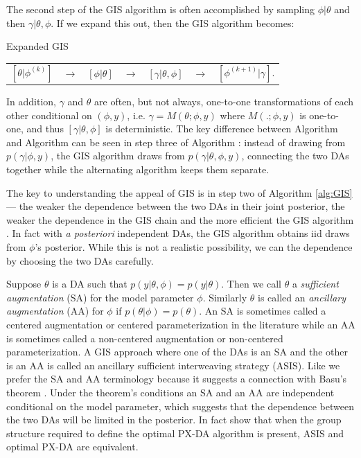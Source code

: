\documentclass[12pt]{article}
\begin{document}
The second step of the GIS algorithm is often accomplished by sampling $\phi|\theta$ and then $\gamma|\theta,\phi$. If we expand this out, then the GIS algorithm becomes:
\begin{alg*}[eGIS]Expanded GIS\label{alg:eGIS}
{\small
  \begin{center}
    \begin{tabular}{lllllll}
      $[\theta|\phi^{(k)}]$& $\to$& $[\phi|\theta]$& $\to $&$[\gamma|\theta,\phi]$& $\to$& $[\phi^{(k+1)}|\gamma]$.
    \end{tabular}
  \end{center}
}
\end{alg*}
\noindent
In addition, $\gamma$ and $\theta$ are often, but not always, one-to-one transformations of each other conditional on $(\phi,y)$, i.e. $\gamma = M(\theta;\phi,y)$ where $M(.;\phi,y)$ is one-to-one, and thus $[\gamma|\theta,\phi]$ is deterministic. The key difference between Algorithm  and Algorithm  can be seen in step three of Algorithm : instead of drawing from $p(\gamma|\phi,y)$, the GIS algorithm draws from $p(\gamma|\theta,\phi,y)$, connecting the two DAs together while the alternating algorithm keeps them separate.

The key to understanding the appeal of GIS is in step two of Algorithm \ref{alg:GIS} --- the weaker the dependence between the two DAs in their joint posterior, the weaker the dependence in the GIS chain and the more efficient the GIS algorithm \citep{yu2011center}. In fact with \emph{a posteriori} independent DAs, the GIS algorithm obtains iid draws from $\phi$'s posterior. While this is not a realistic possibility, we can the dependence by choosing the two DAs carefully. 

Suppose $\theta$ is a DA such that $p(y|\theta,\phi)=p(y|\theta)$. Then we call $\theta$ a {\it sufficient augmentation} (SA) for the model parameter $\phi$. Similarly $\theta$ is called an {\it ancillary augmentation} (AA) for $\phi$ if $p(\theta|\phi)=p(\theta)$. An SA is sometimes called a centered augmentation or centered parameterization in the literature while an AA is sometimes called a non-centered augmentation or non-centered parameterization. A GIS approach where one of the DAs is an SA and the other is an AA is called an ancillary sufficient interweaving strategy (ASIS). Like \citet{yu2011center} we prefer the SA and AA terminology because it suggests a connection with Basu's theorem \citep{basu1955statistics}. Under the theorem's conditions an SA and an AA are independent conditional on the model parameter, which suggests that the dependence between the two DAs will be limited in the posterior. In fact \citet{yu2011center} show that when the group structure required to define the optimal PX-DA algorithm \citep{liu1999parameter} is present, ASIS and optimal PX-DA are equivalent.
\end{document}
